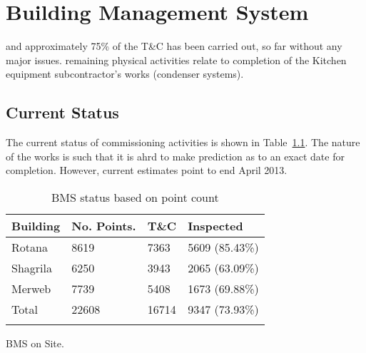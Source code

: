 \chapter{Building Management System}
\label{ch:bms}

 and approximately 75\% of the T\&C has been carried out, so far without any major issues. remaining physical activities relate
to completion of the Kitchen equipment subcontractor's works (condenser systems). 

\section{Current Status}
The current status of commissioning activities is shown in
Table~\ref{tbl:bmsstatus}. The nature of the works is such
that it is ahrd to make prediction as to an exact date
for completion. However, current estimates point to 
end April 2013.
\begin{table}[htbp]
\begin{tabular}{llll}
\toprule
Building   &No. Points. &T\&C &Inspected\\
\midrule
Rotana     & 8619       &7363     & 5609 (85.43\%) \\
Shagrila   & 6250       &3943     & 2065 (63.09\%) \\
Merweb     & 7739       &5408     & 1673 (69.88\%) \\
\midrule
Total      &22608       &16714    &9347 (73.93\%)  \\
\bottomrule 
\caption{BMS status based on point count}
\label{tbl:bmsstatus}
\end{tabular}
\end{table}

 BMS on Site.